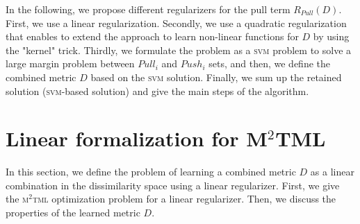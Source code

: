 In the following, we propose different regularizers for the pull term $R_{Pull}(D)$. First, we use a linear regularization. Secondly, we use a quadratic regularization that enables to extend the approach to learn non-linear functions for $D$ by using the "kernel" trick. Thirdly, we formulate the problem as a \textsc{svm} problem to solve a large margin problem between $Pull_i$ and $Push_i$ sets, and then, we define the combined metric $D$ based on the \textsc{svm} solution. Finally, we sum up the retained solution (\textsc{svm}-based solution) and give the main steps of the algorithm.


\section{Linear formalization for M$^2$TML}

In this section, we define the problem of learning a combined metric $D$ as a linear combination in the dissimilarity space using a linear regularizer. First, we give the \textsc{m$^2$tml} optimization problem for a linear regularizer. Then, we discuss the properties of the learned metric $D$.

